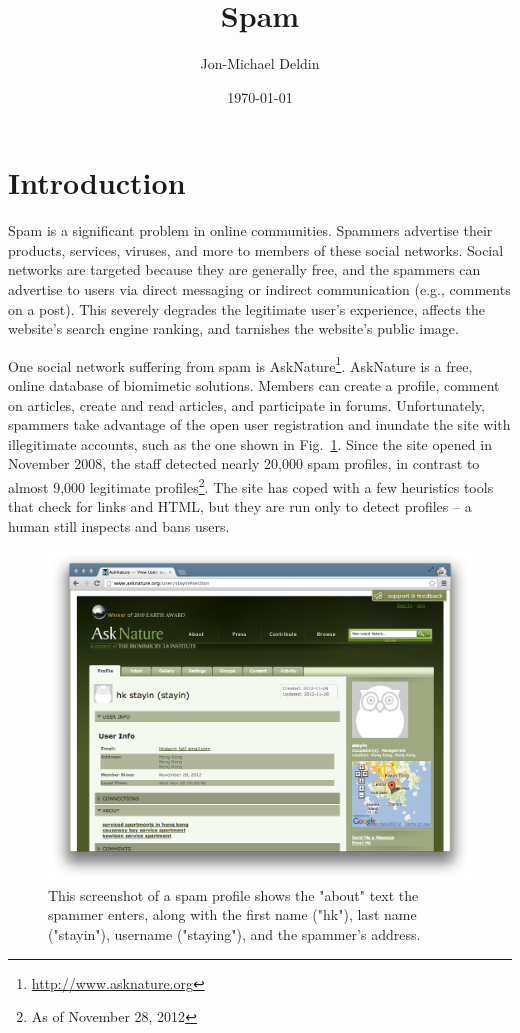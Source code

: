 \documentclass[10pt]{article}
\title{Spam}
\author{Jon-Michael Deldin}
\date{\today}
\begin{document}
\doublespace
\section{Introduction}
Spam is a significant problem in online communities. Spammers advertise their
products, services, viruses, and more to members of these social networks.
Social networks are targeted because they are generally free, and the spammers
can advertise to users via direct messaging or indirect communication (e.g.,
comments on a post). This severely degrades the legitimate user's experience,
affects the website's search engine ranking, and tarnishes the website's
public image.

One social network suffering from spam is
AskNature\footnote{\url{http://www.asknature.org} }. AskNature is a free,
online database of biomimetic\cite{benyus} solutions. Members can create a
profile, comment on articles, create and read articles, and participate in
forums. Unfortunately, spammers take advantage of the open user registration
and inundate the site with illegitimate accounts, such as the one shown in
Fig.~\ref{fig:spam-profile}. Since the site opened in November 2008, the staff
detected nearly 20,000 spam profiles, in contrast to almost 9,000 legitimate
profiles\footnote{As of November 28, 2012 }. The site has coped with a few
heuristics tools that check for links and HTML, but they are run only to
detect profiles -- a human still inspects and bans users.

\begin{figure}[b]
\centering
\includegraphics[width=\textwidth]{fig/spam-profile.png}
\caption{This screenshot of a spam profile shows the "about" text the spammer
enters, along with the first name ("hk"), last name ("stayin"), username
("staying"), and the spammer's address.}
\label{fig:spam-profile}
\end{figure}
\end{document}
